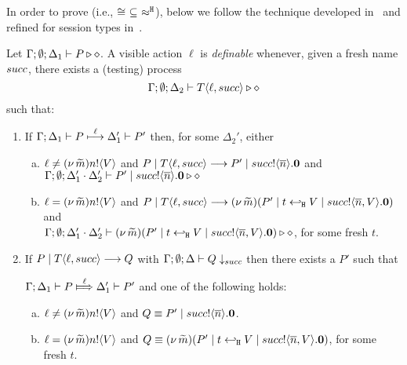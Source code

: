 
In order to prove  (i.e., $\cong\ \subseteq\ \hwb$), below we  follow
the technique developed in~\cite{Hennessy07} and
refined for session types in~\cite{KYHH2015,KY2015}.


\begin{definition}[Definability]\myrm
	\label{app:def:definibility}
	Let $\Gamma; \emptyset; \Delta_1 \vdash P \triangleright \diamond$.
	A visible action $\ell$ is \emph{definable} whenever, given a fresh name $succ$,
	there exists a (testing) process
	$$\Gamma; \emptyset; \Delta_2 \vdash T\langle \ell, succ \rangle \triangleright \diamond$$
	such that:
	\begin{enumerate}[1.]
					\item	If $\Gamma; \Delta_1 \vdash P \stackrel{\ell}{\longmapsto} \Delta_1' \vdash P'$
						then, for some $\Delta_2'$, either
					\begin{enumerate}[a)]
						\item 
							$\ell \neq (\nu\, \widetilde{m})n ! \langle V \rangle$ and $P \;|\; T\langle \ell, succ \rangle \longrightarrow P' \;|\; succ ! \langle \overline{n} \rangle . \mathbf{0}$ 
							and \\
							$\Gamma; \emptyset; \Delta_1' \cdot \Delta_2' \vdash P' \;|\; succ ! \langle \overline{n} \rangle . \mathbf{0} \triangleright \diamond$  
							\item 
							$\ell = (\nu\, \widetilde{m})n ! \langle V \rangle$ and 
							$P \;|\; T\langle \ell, succ \rangle \longrightarrow
							(\nu\, \widetilde{m})(P' \;|\; t \hookleftarrow_{\mathtt{H}} V \;|\; succ ! \langle \overline{n}, V \rangle . \mathbf{0})$
							and \\
							$\Gamma; \emptyset; \Delta_1' \cdot \Delta_2' \vdash
							(\nu\, \widetilde{m})(P' \;|\; t \hookleftarrow_{\mathtt{H}} V \;|\;  succ ! \langle \overline{n}, V \rangle . \mathbf{0}) \triangleright \diamond$, for some fresh $t$.
							\end{enumerate}

			\item If $P \;|\; T\langle \ell, succ \rangle \longrightarrow Q$ with			
						$\Gamma; \emptyset; \Delta \vdash Q \downarrow_{succ}$ then there exists a $P'$ such that
					
 $\horel{\Gamma}{\Delta_1}{P}{\Hby{\ell}}{\Delta_1'}{P'}$
						 and one of the following holds:  
							\begin{enumerate}[a)]
						\item $\ell \neq (\nu\, \widetilde{m})n ! \langle V \rangle$ and $Q \equiv P' \;|\; succ ! \langle \overline{n} \rangle . \mathbf{0}$.
						\item  $\ell = (\nu\, \widetilde{m})n ! \langle V \rangle$ and  $Q \equiv (\nu\, \widetilde{m})(P' \;|\; t \hookleftarrow_{\mathtt{H}} V \;|\; succ ! \langle \overline{n}, V \rangle . \mathbf{0})$, for some fresh $t$.
						\end{enumerate}
				 

\end{enumerate}
\end{definition}

